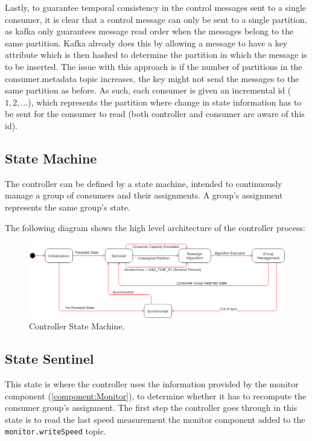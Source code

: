 Lastly, to guarantee temporal consistency in the control messages sent to a
single consumer, it is clear that a control message can only be sent to a single
partition, as kafka only guarantees message read order when the messages belong
to the same partition. Kafka already does this by allowing a message to have a
key attribute which is then hashed to determine the partition in which the
message is to be inserted. The issue with this approach is if the number of
partitions in the consumer.metadata topic increases, the key might not
send the messages to the same partition as before. As such, each consumer is
given an incremental id ($1, 2, ...$), which represents the partition where
change in state information has to be sent for the consumer to read (both
controller and consumer are aware of this id).

\subsection{State Machine}

The controller can be defined by a state machine, intended to continuously
manage a group of consumers and their assignments. A group's assignment
represents the same group's state.

The following diagram shows the high level architecture of the controller
process:

\begin{figure}[H] \centering
\includegraphics[width=\textwidth]{images/controller/state_machine.png}
\caption{Controller State Machine.} \label{fig:state_machine} \end{figure}

\subsection{State Sentinel}

This state is where the controller uses the information provided by the monitor
component (\ref{component:Monitor}), to determine whether it has to recompute
the consumer group's assignment. The first step the controller goes through in
this state is to read the last speed measurement the monitor component added to
the \lstinline{monitor.writeSpeed} topic.

